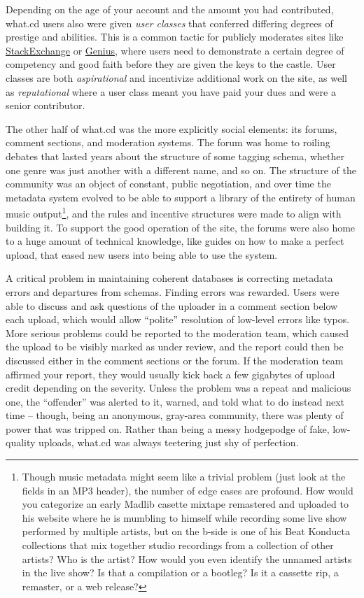 \documentclass[11pt]{article}
\begin{document}
\begin{multicols}{2}
Depending on the age of your account and the amount you had contributed,
what.cd users also were given \emph{user classes} that conferred
differing degrees of prestige and abilities. This is a common tactic for
publicly moderates sites like
\href{https://stackexchange.com}{StackExchange} or
\href{https://genius.com}{Genius}, where users need to demonstrate a
certain degree of competency and good faith before they are given the
keys to the castle. User classes are both \emph{aspirational} and
incentivize additional work on the site, as well as \emph{reputational}
where a user class meant you have paid your dues and were a senior
contributor.

The other half of what.cd was the more explicitly social elements: its
forums, comment sections, and moderation systems. The forum was home to
roiling debates that lasted years about the structure of some tagging
schema, whether one genre was just another with a different name, and so
on. The structure of the community was an object of constant, public
negotiation, and over time the metadata system evolved to be able to
support a library of the entirety of human music output\footnote{Though
  music metadata might seem like a trivial problem (just look at the
  fields in an MP3 header), the number of edge cases are profound. How
  would you categorize an early Madlib casette mixtape remastered and
  uploaded to his website where he is mumbling to himself while
  recording some live show performed by multiple artists, but on the
  b-side is one of his Beat Konducta collections that mix together
  studio recordings from a collection of other artists? Who is the
  artist? How would you even identify the unnamed artists in the live
  show? Is that a compilation or a bootleg? Is it a cassette rip, a
  remaster, or a web release?}, and the rules and incentive structures
were made to align with building it. To support the good operation of
the site, the forums were also home to a huge amount of technical
knowledge, like guides on how to make a perfect upload, that eased new
users into being able to use the system.

A critical problem in maintaining coherent databases is correcting
metadata errors and departures from schemas. Finding errors was
rewarded. Users were able to discuss and ask questions of the uploader
in a comment section below each upload, which would allow ``polite''
resolution of low-level errors like typos. More serious problems could
be reported to the moderation team, which caused the upload to be
visibly marked as under review, and the report could then be discussed
either in the comment sections or the forum. If the moderation team
affirmed your report, they would usually kick back a few gigabytes of
upload credit depending on the severity. Unless the problem was a repeat
and malicious one, the ``offender'' was alerted to it, warned, and told
what to do instead next time -- though, being an anonymous, gray-area
community, there was plenty of power that was tripped on. Rather than
being a messy hodgepodge of fake, low-quality uploads, what.cd was
always teetering just shy of perfection.


\end{multicols}
\end{document}
